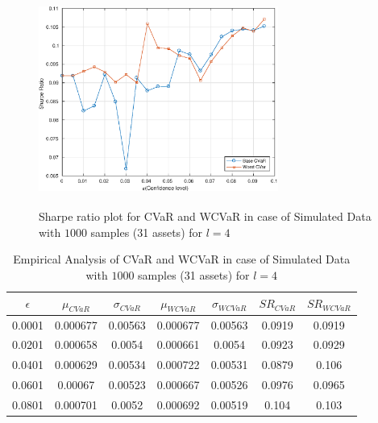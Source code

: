 \begin{figure}[!h]
    \centering
   
    \includegraphics[height=7.0cm,width=0.7\textwidth]{CVaR/bse30_simulated/sr_1000_4.eps}

   \caption{Sharpe ratio plot for CVaR and WCVaR in case of Simulated Data with $1000$ samples (31 assets) for $l=4$}
   \label{fig:6.3}
\end{figure}

\begin{table}[!h]
    \centering
    \captionsetup{justification=centering}

   \begin{tabular}{||c|c|c|c|c|c|c||}
   \hline
  
$\epsilon$ & $\mu_{CVaR}$ & $\sigma_{CVaR}$ & $\mu_{WCVaR}$ & $\sigma_{WCVaR}$ & $SR_{CVaR}$ & $SR_{WCVaR}$\\
  
  \hline
0.0001 & 0.000677 & 0.00563 & 0.000677 & 0.00563 & 0.0919 & 0.0919 \\
0.0201 & 0.000658 & 0.0054 & 0.000661 & 0.0054 & 0.0923 & 0.0929 \\
0.0401 & 0.000629 & 0.00534 & 0.000722 & 0.00531 & 0.0879 & 0.106 \\
0.0601 & 0.00067 & 0.00523 & 0.000667 & 0.00526 & 0.0976 & 0.0965 \\
0.0801 & 0.000701 & 0.0052 & 0.000692 & 0.00519 & 0.104 & 0.103 \\
  \hline
\end{tabular}
    \caption{Empirical Analysis of CVaR and WCVaR in case of Simulated Data with $1000$ samples (31 assets) for $l=4$}
    \label{tab:6.3}
\end{table}



